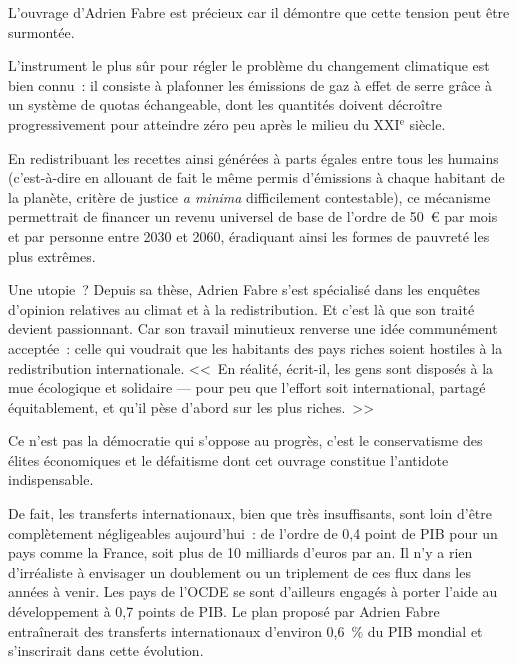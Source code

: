 \documentclass[a5paper,french,openany]{memoir}
\begin{document}
L'ouvrage d'Adrien Fabre est précieux car il démontre que cette tension peut être surmontée. 

L'instrument le plus sûr pour régler le problème du changement climatique est bien connu~: il consiste à plafonner les émissions de gaz à effet de serre grâce à un système de quotas échangeable, dont les quantités doivent décroître progressivement pour atteindre zéro peu après le milieu du XXI$^\text{e}$ siècle. 

En redistribuant les recettes ainsi générées à parts égales entre tous les humains (c'est-à-dire en allouant de fait le même permis d'émissions à chaque habitant de la planète, critère de justice \textit{a minima} difficilement contestable), ce mécanisme permettrait de financer un revenu universel de base de l'ordre de 50~\euro{} par mois et par personne entre 2030 et 2060, éradiquant ainsi les formes de pauvreté les plus extrêmes. 

Une utopie~? Depuis sa thèse, Adrien Fabre s'est spécialisé dans les enquêtes d'opinion relatives au climat et à la redistribution. Et c'est là que son traité devient passionnant. Car son travail minutieux renverse une idée communément acceptée~: celle qui voudrait que les habitants des pays riches soient hostiles à la redistribution internationale. <<~En réalité, écrit-il, les gens sont disposés à la mue écologique et solidaire — pour peu que l'effort soit international, partagé équitablement, et qu'il pèse d'abord sur les plus riches.~>> 

Ce n'est pas la démocratie qui s'oppose au progrès, c'est le conservatisme des élites économiques et le défaitisme dont cet ouvrage constitue l'antidote indispensable.

De fait, les transferts internationaux, bien que très insuffisants, sont loin d'être complètement négligeables aujourd'hui~: de l'ordre de 0,4 point de PIB pour un pays comme la France, soit plus de 10 milliards d'euros par an. Il n'y a rien d'irréaliste à envisager un doublement ou un triplement de ces flux dans les années à venir. Les pays de l'OCDE se sont d'ailleurs engagés à porter l'aide au développement à 0,7 points de PIB. Le plan proposé par Adrien Fabre entraînerait des transferts internationaux d'environ 0,6~\% du PIB mondial et s'inscrirait dans cette évolution. 
\end{document}
